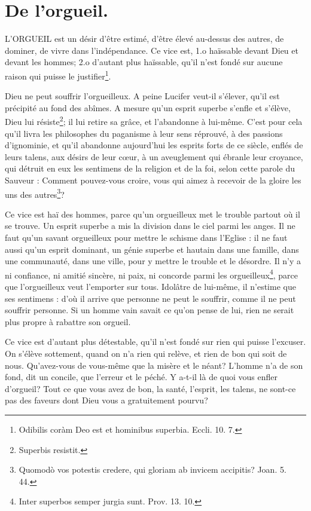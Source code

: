 \documentclass[instructions.tex]{subfiles}
\begin{document}
 
\chapter{De l’orgueil.}
 
L’ORGUEIL est un désir d’être estimé, d’être élevé au-dessus des autres, de dominer, de vivre dans l’indépendance. Ce vice est, 1.o haïssable devant Dieu et devant les hommes; 2.o d’autant plus haïssable, qu’il n’est fondé sur aucune raison qui puisse le justifier\footnote{Odibilis coràm Deo est et hominibus superbia. Eccli. 10. 7.}.
 
\primo Dieu ne peut souffrir l’orgueilleux. A peine Lucifer veut-il s’élever, qu’il est précipité au fond des abîmes. A mesure qu’un esprit superbe s’enfle et s’élève, Dieu lui résiste\footnote{Superbis resistit.}; il lui retire sa grâce, et l’abandonne à lui-même. C’est pour cela qu’il livra les philosophes du paganisme à leur sens réprouvé, à des passions d’ignominie, et qu’il abandonne aujourd’hui les esprits forts de ce siècle, enflés de leurs talens, aux désirs de leur cœur, à un aveuglement qui ébranle leur croyance, qui détruit en eux les sentimens de la religion et de la foi, selon cette parole du Sauveur : Comment pouvez-vous croire, vous qui aimez à recevoir de la gloire les uns des autres\footnote{Quomodò vos potestis credere, qui gloriam ab invicem accipitis? Joan. 5. 44.}?
 
Ce vice est haï des hommes, parce qu’un orgueilleux met le trouble partout où il se trouve. Un esprit superbe a mis la division dans le ciel parmi les anges. Il ne faut qu’un savant orgueilleux pour mettre le schisme dans l’Eglise : il ne faut aussi qu’un esprit dominant, un génie superbe et hautain dans une famille, dans une communauté, dans une ville, pour y mettre le trouble et le désordre. Il n’y a ni confiance, ni amitié sincère, ni paix, ni concorde parmi les orgueilleux\footnote{Inter superbos semper jurgia sunt. Prov. 13. 10.}, parce que l’orgueilleux veut l’emporter sur tous. Idolâtre de lui-même, il n’estime que ses sentimens : d’où il arrive que personne ne peut le souffrir, comme il ne peut souffrir personne. Si un homme vain savait ce qu’on pense de lui, rien ne serait plus propre à rabattre son orgueil.
 
\secundo Ce vice est d’autant plus détestable, qu’il n’est fondé sur rien qui puisse l’excuser. On s’élève sottement, quand on n’a rien qui relève, et rien de bon qui soit de nous. Qu’avez-vous de vous-même que la misère et le néant? L’homme n’a de son fond, dit un concile, que l’erreur et le péché. Y a-t-il là de quoi vous enfler d’orgueil? Tout ce que vous avez de bon, la santé, l’esprit, les talens, ne sont-ce pas des faveurs dont Dieu vous a gratuitement pourvu?
 
\end{document}
